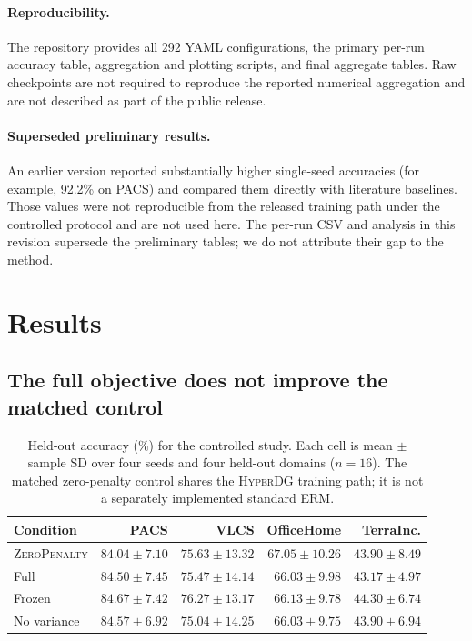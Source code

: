 \documentclass[10pt]{article}
\newcommand{\method}{\textsc{HyperDG}}
\newcommand{\control}{\textsc{ZeroPenalty}}
\begin{document}
\paragraph{Reproducibility.}
The repository provides all 292 YAML configurations, the primary per-run
accuracy table, aggregation and plotting scripts, and final aggregate tables.
Raw checkpoints are not required to reproduce the reported numerical
aggregation and are not described as part of the public release.

\paragraph{Superseded preliminary results.}
An earlier version reported substantially higher single-seed accuracies (for
example, 92.2\% on PACS) and compared them directly with literature baselines.
Those values were not reproducible from the released training path under the
controlled protocol and are not used here. The per-run CSV and analysis in
this revision supersede the preliminary tables; we do not attribute their gap
to the method.

\section{Results}
\label{sec:results}

\subsection{The full objective does not improve the matched control}

\begin{table}[t]
\centering
\caption{Held-out accuracy (\%) for the controlled study. Each cell is mean
$\pm$ sample SD over four seeds and four held-out domains ($n=16$). The matched
zero-penalty control shares the \method{} training path; it is not a separately
implemented standard ERM.}
\label{tab:accuracy}
\setlength{\tabcolsep}{4.5pt}
\begin{tabular}{lrrrr}
\toprule
Condition & PACS & VLCS & OfficeHome & TerraInc. \\
\midrule
\control{} & $84.04\pm7.10$ & $75.63\pm13.32$ & $67.05\pm10.26$ & $43.90\pm8.49$ \\
Full      & $84.50\pm7.45$ & $75.47\pm14.14$ & $66.03\pm9.98$  & $43.17\pm4.97$ \\
Frozen    & $84.67\pm7.42$ & $76.27\pm13.17$ & $66.13\pm9.78$  & $44.30\pm6.74$ \\
No variance & $84.57\pm6.92$ & $75.04\pm14.25$ & $66.03\pm9.75$ & $43.90\pm6.94$ \\
\bottomrule
\end{tabular}
\end{table}
\end{document}
